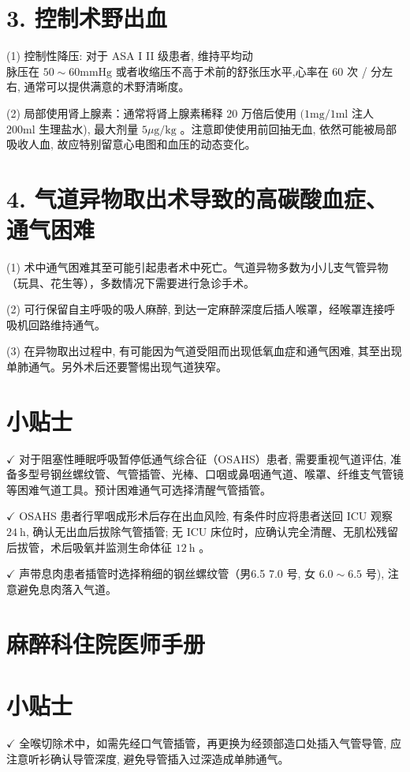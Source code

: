 \documentclass[10pt]{article}
\begin{document}
\section*{3. 控制术野出血}
(1) 控制性降压: 对于 ASA I II 级患者, 维持平均动\\
脉压在 $50 \sim 60 \mathrm{mmHg}$ 或者收缩压不高于术前的舒张压水平,心率在 60 次 / 分左右, 通常可以提供满意的术野清晰度。

(2) 局部使用肾上腺素：通常将肾上腺素稀释 20 万倍后使用 $(1 \mathrm{mg} / 1 \mathrm{ml}$ 注人 $200 \mathrm{ml}$ 生理盐水), 最大剂量 $5 \mu \mathrm{g} / \mathrm{kg}$ 。注意即使使用前回抽无血, 依然可能被局部吸收人血, 故应特别留意心电图和血压的动态变化。

\section*{4. 气道异物取出术导致的高碳酸血症、通气困难}
(1) 术中通气困难其至可能引起患者术中死亡。气道异物多数为小儿支气管异物（玩具、花生等），多数情况下需要进行急诊手术。

(2) 可行保留自主呼吸的吸人麻醉, 到达一定麻醉深度后插人喉罩，经喉罩连接呼吸机回路维持通气。

(3) 在异物取出过程中, 有可能因为气道受阻而出现低氧血症和通气困难, 其至出现单肺通气。另外术后还要警惕出现气道狭窄。

\section*{小贴士}
$\checkmark$ 对于阻塞性睡眠呼吸暂停低通气综合征（OSAHS）患者, 需要重视气道评估, 准备多型号钢丝螺纹管、气管插管、光棒、口咽或鼻咽通气道、喉罩、纤维支气管镜等困难气道工具。预计困难通气可选择清醒气管插管。

$\checkmark$ OSAHS 患者行䍐咽成形术后存在出血风险, 有条件时应将患者送回 ICU 观察 $24 \mathrm{~h}$, 确认无出血后拔除气管插管; 无 ICU 床位时，应确认完全清醒、无肌松残留后拔管，术后吸氧并监测生命体征 $12 \mathrm{~h}$ 。

$\checkmark$ 声带息肉患者插管时选择稍细的钢丝螺纹管（男6.5 7.0 号, 女 $6.0 \sim 6.5$ 号), 注意避免息肉落入气道。

\section*{麻醉科住院医师手册}
\section*{小贴士}
$\checkmark$ 全喉切除术中，如需先经口气管插管，再更换为经颈部造口处插入气管导管, 应注意听衫确认导管深度, 避免导管插入过深造成单肺通气。
\end{document}
